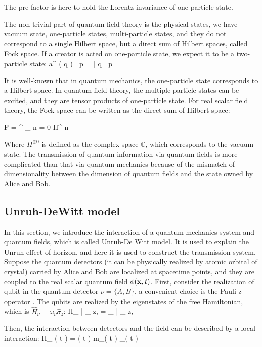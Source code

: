 \documentclass[a4paper,12pt]{article}
\begin{document}
The pre-factor is here to hold the Lorentz invariance of one particle state.

The non-trivial part of quantum field theory is the physical states, we have vacuum state, one-particle states, multi-particle states, and they do not correspond to a single Hilbert space, but a direct sum of Hilbert spaces, called Fock space.
If a creator is acted on one-particle state, we expect it to be a two-particle state:
\be
    \hat a^{ \dagger } ( \mb q ) | \mb p \ar = | \mb q \ar \otimes | \mb p \ar
\ee

It is well-known that in quantum mechanics, the one-particle state corresponds to a Hilbert space.
In quantum field theory, the multiple particle states can be excited, and they are tensor products of one-particle state.
For real scalar field theory, the Fock space can be written as the direct sum of Hilbert space:

\be
    F = \bigoplus^{ \infty }_{ n = 0 } H^{ \otimes n }
\ee

Where $ H^{ \otimes 0 } $ is defined as the complex space $ \mathbb{ C } $, which corresponds to the vacuum state.
The transmission of quantum information via quantum fields is more complicated than that via quantum mechanics because of the mismatch of dimensionality between the dimension of quantum fields and the state owned by Alice and Bob.

\subsection*{Unruh-DeWitt model}
In this section, we introduce the interaction of a quantum mechanics system and quantum fields, which is called Unruh-De Witt model\cite{PhysRevD.101.036014}\cite{article}.
It is used to explain the Unruh-effect of horizon, and here it is used to construct the transmission system.
Suppose the quantum detectors (it can be physically realized by atomic orbital of crystal) carried by Alice and Bob are localized at spacetime points, and they are coupled to the real scalar quantum field $\phi( \mathbf x, t )$.
First, consider the realization of qubit in the quantum detector $ \nu = \{A, B\} $, a convenient choice is the Pauli z-operator \cite{PhysRevD.101.036014}.
The qubits are realized by the eigenstates of the free Hamiltonian, which is $ \hat H_{ \nu } = \omega_\nu \hat \sigma_z $:
\be
    \hat H_{ \nu } | \pm_{ z, \nu } \ar = \pm \omega_{ \nu } | \pm_{ z, \nu } \ar
\ee

Then, the interaction between detectors and the field can be described by a local interaction:
\be
    \hat H_{ \nu }( t ) = \lambda \chi( t ) \hat m_\nu( t ) \otimes {}_\nu ( t )
\ee
\end{document}
